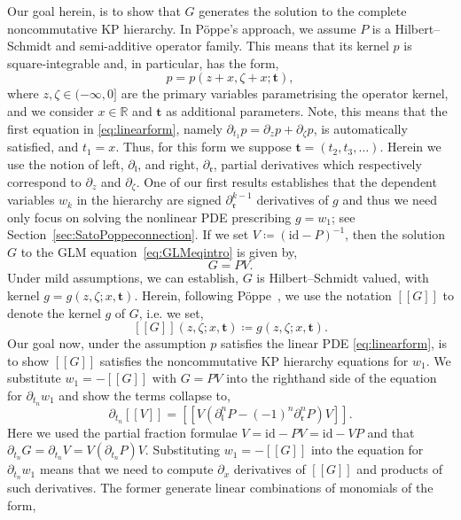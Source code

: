 \documentclass[5p,twocolumn]{elsarticle}
\newcommand*{\id}{{\mathrm{id}}}
\newcommand*{\R}{\mathbb R}
\newcommand*{\pa}{{\partial}}
\newcommand*{\lb}{[\![}
\newcommand*{\rb}{]\!]}
\newcommand*{\tbf}{\boldsymbol{t}}
\newcommand*{\el}{\mathfrak l}
\newcommand*{\rl}{\mathfrak r}
\begin{document}
Our goal herein, is to show that $G$ generates the solution to the complete noncommutative KP hierarchy.
In P\"oppe's approach, we assume $P$ is a Hilbert--Schmidt and semi-additive operator family.
This means that its kernel $p$ is square-integrable and, in particular, has the form,
\begin{equation*}
p=p(z+x,\zeta+x;\tbf),
\end{equation*}
where $z,\zeta\in(-\infty,0]$ are the primary variables parametrising the operator kernel, and we consider $x\in\R$ and $\tbf$ as additional parameters.
Note, this means that the first equation in \eqref{eq:linearform}, namely $\pa_{t_1}p=\pa_z p+\pa_\zeta p$, is automatically satisfied, and $t_1=x$.
Thus, for this form we suppose $\tbf=(t_2,t_3,\ldots)$.
Herein we use the notion of left, $\pa_{\el}$, and right, $\pa_{\rl}$, partial derivatives which respectively correspond to $\pa_z$ and $\pa_\zeta$.
One of our first results establishes that the dependent variables $w_k$ in the hierarchy are signed $\pa_{\rl}^{k-1}$ derivatives of $g$
and thus we need only focus on solving the nonlinear PDE prescribing $g=w_1$; see Section~\ref{sec:SatoPoppeconnection}.
If we set $V\coloneqq(\id-P)^{-1}$, then the solution $G$ to the GLM equation~\eqref{eq:GLMeqintro} is given by, 
\begin{equation*}
G=PV.
\end{equation*}
Under mild assumptions, we can establish, $G$ is Hilbert--Schmidt valued, with kernel $g=g(z,\zeta;x,\tbf)$. 
Herein, following P\"oppe~\cite{PKP}, we use the notation $\lb G\rb$ to denote the kernel $g$ of $G$, i.e.\/ we set,
\begin{equation}\label{eq:bracketnotation}
\lb G\rb(z,\zeta;x,\tbf)\coloneqq g(z,\zeta;x,\tbf).
\end{equation}
Our goal now, under the assumption $p$ satisfies the linear PDE \eqref{eq:linearform},
is to show $\lb G\rb$ satisfies the noncommutative KP hierarchy equations for $w_1$.
We substitute $w_1=-\lb G\rb$ with $G=PV$ into the righthand side of the equation for $\pa_{t_n}w_1$  
and show the terms collapse to,
\begin{equation*}
  \pa_{t_n}\lb V\rb=\lb V(\pa_{\el}^nP-(-1)^n\pa_{\rl}^nP)V\rb.
\end{equation*}
Here we used the partial fraction formulae $V=\id-PV=\id-VP$ and that $\pa_{t_n}G=\pa_{t_n}V=V(\pa_{t_n}P)V$.
Substituting $w_1=-\lb G\rb$ into the equation for $\pa_{t_n}w_1$ means that we need to compute $\pa_x$ derivatives
of $\lb G\rb$ and products of such derivatives. The former generate linear combinations of monomials of the form,
\end{document}
